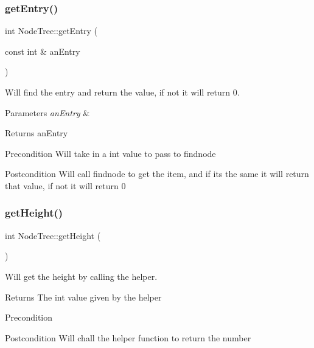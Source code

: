 \subsubsection{\texorpdfstring{get\+Entry()}{getEntry()}}
{\footnotesize\ttfamily int Node\+Tree\+::get\+Entry (\begin{DoxyParamCaption}\item[{const int \&}]{an\+Entry }\end{DoxyParamCaption})}



Will find the entry and return the value, if not it will return 0. 


\begin{DoxyParams}{Parameters}
{\em an\+Entry} & \\
\hline
\end{DoxyParams}
\begin{DoxyReturn}{Returns}
an\+Entry 
\end{DoxyReturn}
\begin{DoxyPrecond}{Precondition}
Will take in a int value to pass to findnode 
\end{DoxyPrecond}
\begin{DoxyPostcond}{Postcondition}
Will call findnode to get the item, and if its the same it will return that value, if not it will return 0 
\end{DoxyPostcond}
\mbox{\label{class_node_tree_a711fa23ec5715b82c1a6dee780fde087}} 
\subsubsection{\texorpdfstring{get\+Height()}{getHeight()}}
{\footnotesize\ttfamily int Node\+Tree\+::get\+Height (\begin{DoxyParamCaption}{ }\end{DoxyParamCaption})}



Will get the height by calling the helper. 

\begin{DoxyReturn}{Returns}
The int value given by the helper 
\end{DoxyReturn}
\begin{DoxyPrecond}{Precondition}

\end{DoxyPrecond}
\begin{DoxyPostcond}{Postcondition}
Will chall the helper function to return the number 
\end{DoxyPostcond}
\mbox{\label{class_node_tree_ab619ff00f2cd2362d393ad41f2844129}} 
